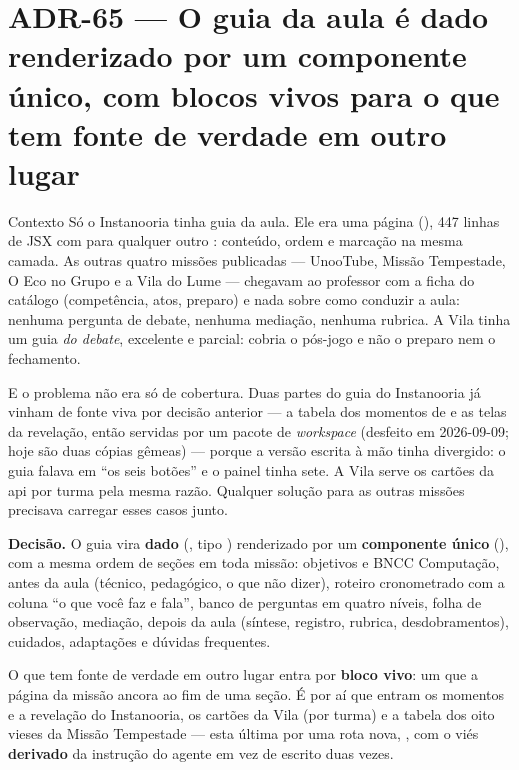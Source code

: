 \section{ADR-65 --- O guia da aula é dado renderizado por um componente único,
com blocos vivos para o que tem fonte de verdade em outro lugar}
\label{adr:guia-como-dado}

\begin{especificacao}{Contexto}
Só o Instanooria tinha guia da aula. Ele era uma página
(), 447 linhas de JSX com 
para qualquer outro : conteúdo, ordem e marcação na mesma camada. As
outras quatro missões publicadas --- UnooTube, Missão Tempestade, O Eco no Grupo
e a Vila do Lume --- chegavam ao professor com a ficha do catálogo (competência,
atos, preparo) e nada sobre como conduzir a aula: nenhuma pergunta de debate,
nenhuma mediação, nenhuma rubrica. A Vila tinha um guia \emph{do debate},
excelente e parcial: cobria o pós-jogo e não o preparo nem o fechamento.

E o problema não era só de cobertura. Duas partes do guia do Instanooria já
vinham de fonte viva por decisão anterior --- a tabela dos momentos de
 e as telas da revelação, então servidas por um
pacote de \emph{workspace} (desfeito em 2026-09-09; hoje são duas cópias
gêmeas) --- porque a versão escrita à mão tinha divergido: o
guia falava em \enquote{os seis botões} e o painel tinha sete. A Vila serve os
cartões da api por turma pela mesma razão. Qualquer solução para as outras
missões precisava carregar esses casos junto.
\end{especificacao}

\textbf{Decisão.} O guia vira \textbf{dado}
(, tipo ) renderizado
por um \textbf{componente único} (), com a mesma
ordem de seções em toda missão: objetivos e BNCC Computação, antes da aula
(técnico, pedagógico, o que não dizer), roteiro cronometrado com a coluna
\enquote{o que você faz e fala}, banco de perguntas em quatro níveis, folha de
observação, mediação, depois da aula (síntese, registro, rubrica,
desdobramentos), cuidados, adaptações e dúvidas frequentes.

O que tem fonte de verdade em outro lugar entra por \textbf{bloco vivo}: um
 que a página da missão ancora ao fim de uma seção. É por aí que
entram os momentos e a revelação do Instanooria, os cartões da Vila (por turma)
e a tabela dos oito vieses da Missão Tempestade --- esta última por uma rota
nova, , com o viés \textbf{derivado} da
instrução do agente em vez de escrito duas vezes.

